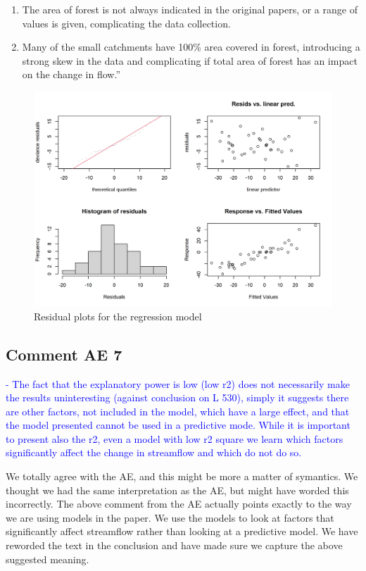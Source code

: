 \documentclass[]{elsarticle} %
\providecommand{\tightlist}{%
  \setlength{\itemsep}{0pt}\setlength{\parskip}{0pt}}
\begin{document}
\begin{enumerate}
\def\labelenumi{\arabic{enumi}.}
\tightlist
\item
  The area of forest is not always indicated in the original papers, or a range of values is given, complicating the data collection.
\item
  Many of the small catchments have 100\% area covered in forest, introducing a strong skew in the data and complicating if total area of forest has an impact on the change in flow.''
\end{enumerate}

\begin{figure}
\includegraphics[width=0.9\linewidth]{residual_plot_model_Farea} \caption{Residual plots for the regression model }\label{fig:gamcheckmodelarea}
\end{figure}

\hypertarget{comment-ae-7}{%
\subsection{Comment AE 7}\label{comment-ae-7}}

\textcolor{blue}{- The fact that the explanatory power is low (low r2) does not necessarily make the results uninteresting (against conclusion on L 530), simply it suggests there are other factors, not included in the model, which have a large effect, and that the model presented cannot be used in a predictive mode. While it is important to present also the r2, even a model with low r2 square we learn which factors significantly affect the change in streamflow and which do not do so.}

We totally agree with the AE, and this might be more a matter of symantics. We thought we had the same interpretation as the AE, but might have worded this incorrectly. The above comment from the AE actually points exactly to the way we are using models in the paper. We use the models to look at factors that significantly affect streamflow rather than looking at a predictive model.
We have reworded the text in the conclusion and have made sure we capture the above suggested meaning.


\end{document}
